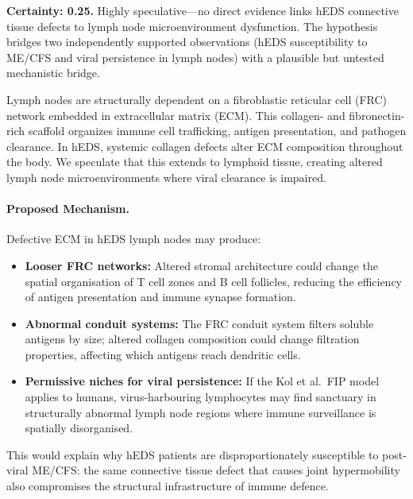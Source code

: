 \begin{speculation}
\label{spec:heds-lymphnode-architecture}

\textbf{Certainty: 0.25.} Highly speculative---no direct evidence links hEDS connective tissue defects to lymph node microenvironment dysfunction. The hypothesis bridges two independently supported observations (hEDS susceptibility to ME/CFS and viral persistence in lymph nodes) with a plausible but untested mechanistic bridge.

Lymph nodes are structurally dependent on a fibroblastic reticular cell (FRC) network embedded in extracellular matrix (ECM). This collagen- and fibronectin-rich scaffold organizes immune cell trafficking, antigen presentation, and pathogen clearance. In hEDS, systemic collagen defects alter ECM composition throughout the body. We speculate that this extends to lymphoid tissue, creating altered lymph node microenvironments where viral clearance is impaired.

\paragraph{Proposed Mechanism.}
Defective ECM in hEDS lymph nodes may produce:
\begin{itemize}
    \item \textbf{Looser FRC networks:} Altered stromal architecture could change the spatial organisation of T cell zones and B cell follicles, reducing the efficiency of antigen presentation and immune synapse formation.
    \item \textbf{Abnormal conduit systems:} The FRC conduit system filters soluble antigens by size; altered collagen composition could change filtration properties, affecting which antigens reach dendritic cells.
    \item \textbf{Permissive niches for viral persistence:} If the Kol et al.\ FIP model~\cite{Kol2026fipv} applies to humans, virus-harbouring lymphocytes may find sanctuary in structurally abnormal lymph node regions where immune surveillance is spatially disorganised.
\end{itemize}

This would explain why hEDS patients are disproportionately susceptible to post-viral ME/CFS: the same connective tissue defect that causes joint hypermobility also compromises the structural infrastructure of immune defence.


\end{speculation}

